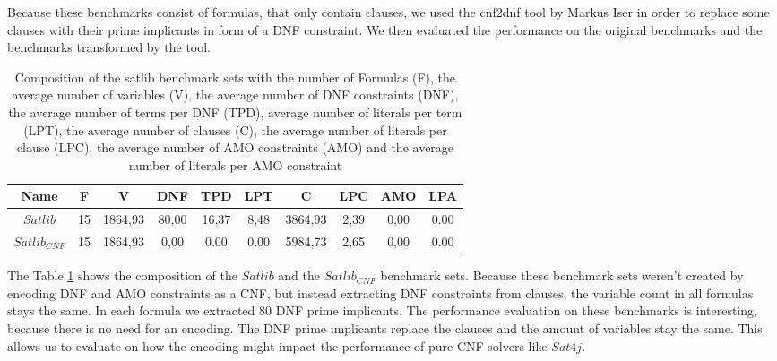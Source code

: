 Because these benchmarks consist of formulas, that only contain clauses, we used the cnf2dnf tool \cite{iser_pi-explanations_2022} by Markus Iser in order to replace some clauses with their prime implicants in form of a DNF constraint. We then evaluated the performance on the original benchmarks and the benchmarks transformed by the tool.

\begin{table}[!htb]
\centering
\caption[Composition of the satlib benchmark sets]{Composition of the satlib benchmark sets with the number of Formulas (F), the average number of variables (V), the average number of DNF constraints (DNF), the average number of terms per DNF (TPD), average number of literals per term (LPT), the average number of clauses (C), the average number of literals per clause (LPC), the average number of AMO constraints (AMO) and the average number of literals per AMO constraint}
\label{tab:satlib}
\begin{tabular}{|c|c|c|c|c|c|c|c|c|c|}
\hline
Name & F & V & DNF & TPD & LPT & C & LPC & AMO & LPA \\
\hline
$Satlib$ & 15 & 1864,93 & 80,00 & 16,37 & 8,48 & 3864,93 & 2,39 & 0,00 & 0.00 \\ 
 \hline 
$Satlib_{CNF}$ & 15 & 1864,93 & 0,00 & 0.00 & 0.00 & 5984,73 & 2,65 & 0,00 & 0.00 \\ 
 \hline 
\end{tabular}
\end{table}

The Table \ref{tab:satlib} shows the composition of the $Satlib$ and the $Satlib_{CNF}$ benchmark sets. Because these benchmark sets weren't created by encoding DNF and AMO constraints as a CNF, but instead extracting DNF constraints from clauses, the variable count in all formulas stays the same. In each formula we extracted 80 DNF prime implicants. The performance evaluation on these benchmarks is interesting, because there is no need for an encoding. The DNF prime implicants replace the clauses and the amount of variables stay the same. This allows us to evaluate on how the encoding might impact the performance of pure CNF solvers like $Sat4j$.




